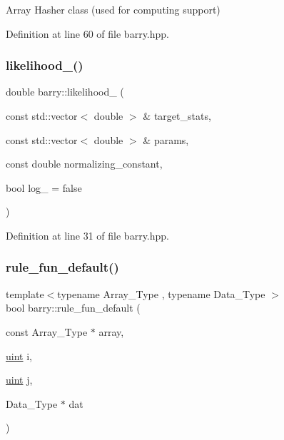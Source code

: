 Array Hasher class (used for computing support) 



Definition at line 60 of file barry.\+hpp.

\mbox{\label{namespacebarry_a1dcc0a46544cc9733ca8ee5619ef6d20}} 
\subsubsection{\texorpdfstring{likelihood\+\_\+()}{likelihood\_()}}
{\footnotesize\ttfamily double barry\+::likelihood\+\_\+ (\begin{DoxyParamCaption}\item[{const std\+::vector$<$ double $>$ \&}]{target\+\_\+stats,  }\item[{const std\+::vector$<$ double $>$ \&}]{params,  }\item[{const double}]{normalizing\+\_\+constant,  }\item[{bool}]{log\+\_\+ = {\ttfamily false} }\end{DoxyParamCaption})\hspace{0.3cm}{\ttfamily [inline]}}



Definition at line 31 of file barry.\+hpp.

\mbox{\label{namespacebarry_afb5a6f58fa7969d3027468e393eecd51}} 
\subsubsection{\texorpdfstring{rule\+\_\+fun\+\_\+default()}{rule\_fun\_default()}}
{\footnotesize\ttfamily template$<$typename Array\+\_\+\+Type , typename Data\+\_\+\+Type $>$ \\
bool barry\+::rule\+\_\+fun\+\_\+default (\begin{DoxyParamCaption}\item[{const Array\+\_\+\+Type $\ast$}]{array,  }\item[{\hyperlink{namespacebarry_a11dfc53ddb4672278319aa04f1e09a6c}{uint}}]{i,  }\item[{\hyperlink{namespacebarry_a11dfc53ddb4672278319aa04f1e09a6c}{uint}}]{j,  }\item[{Data\+\_\+\+Type $\ast$}]{dat }\end{DoxyParamCaption})}



